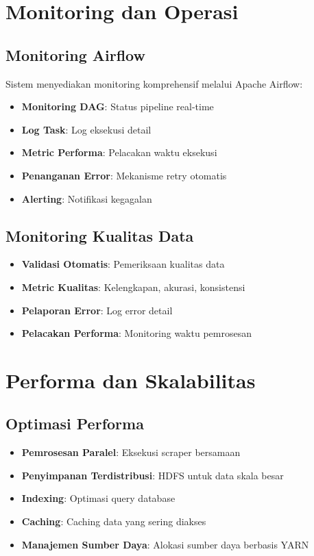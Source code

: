 \documentclass[12pt,a4paper]{article}
\begin{document}
\section{Monitoring dan Operasi}

\subsection{Monitoring Airflow}
Sistem menyediakan monitoring komprehensif melalui Apache Airflow:

\begin{itemize}
    \item \textbf{Monitoring DAG}: Status pipeline real-time
    \item \textbf{Log Task}: Log eksekusi detail
    \item \textbf{Metric Performa}: Pelacakan waktu eksekusi
    \item \textbf{Penanganan Error}: Mekanisme retry otomatis
    \item \textbf{Alerting}: Notifikasi kegagalan
\end{itemize}

\subsection{Monitoring Kualitas Data}
\begin{itemize}
    \item \textbf{Validasi Otomatis}: Pemeriksaan kualitas data
    \item \textbf{Metric Kualitas}: Kelengkapan, akurasi, konsistensi
    \item \textbf{Pelaporan Error}: Log error detail
    \item \textbf{Pelacakan Performa}: Monitoring waktu pemrosesan
\end{itemize}

\section{Performa dan Skalabilitas}

\subsection{Optimasi Performa}
\begin{itemize}
    \item \textbf{Pemrosesan Paralel}: Eksekusi scraper bersamaan
    \item \textbf{Penyimpanan Terdistribusi}: HDFS untuk data skala besar
    \item \textbf{Indexing}: Optimasi query database
    \item \textbf{Caching}: Caching data yang sering diakses
    \item \textbf{Manajemen Sumber Daya}: Alokasi sumber daya berbasis YARN
\end{itemize}
\end{document}
